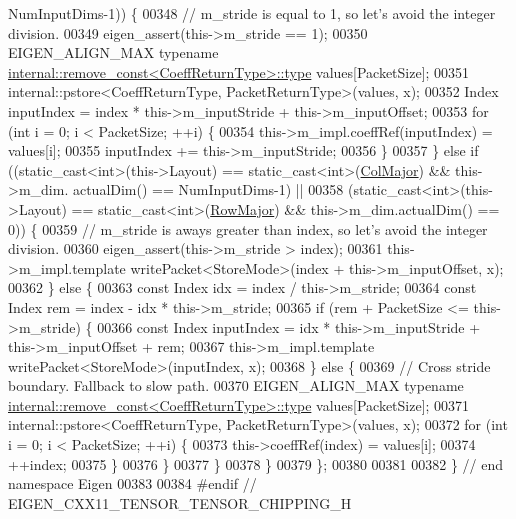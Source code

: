 \begin{DoxyCode}
      NumInputDims-1)) \{
00348       \textcolor{comment}{// m\_stride is equal to 1, so let's avoid the integer division.}
00349       eigen\_assert(this->m\_stride == 1);
00350       EIGEN\_ALIGN\_MAX \textcolor{keyword}{typename} \hyperlink{group___sparse_core___module}{internal::remove\_const<CoeffReturnType>::type}
       values[PacketSize];
00351       internal::pstore<CoeffReturnType, PacketReturnType>(values, x);
00352       Index inputIndex = index * this->m\_inputStride + this->m\_inputOffset;
00353       \textcolor{keywordflow}{for} (\textcolor{keywordtype}{int} i = 0; i < PacketSize; ++i) \{
00354         this->m\_impl.coeffRef(inputIndex) = values[i];
00355         inputIndex += this->m\_inputStride;
00356       \}
00357     \} \textcolor{keywordflow}{else} \textcolor{keywordflow}{if} ((static\_cast<int>(this->Layout) == static\_cast<int>(\hyperlink{group__enums_ggaacded1a18ae58b0f554751f6cdf9eb13a0cbd4bdd0abcfc0224c5fcb5e4f6669a}{ColMajor}) && this->m\_dim.
      actualDim() == NumInputDims-1) ||
00358            (static\_cast<int>(this->Layout) == \textcolor{keyword}{static\_cast<}\textcolor{keywordtype}{int}\textcolor{keyword}{>}(\hyperlink{group__enums_ggaacded1a18ae58b0f554751f6cdf9eb13acfcde9cd8677c5f7caf6bd603666aae3}{RowMajor}) && this->m\_dim.actualDim()
       == 0)) \{
00359       \textcolor{comment}{// m\_stride is aways greater than index, so let's avoid the integer division.}
00360       eigen\_assert(this->m\_stride > index);
00361       this->m\_impl.template writePacket<StoreMode>(index + this->m\_inputOffset, x);
00362     \} \textcolor{keywordflow}{else} \{
00363       \textcolor{keyword}{const} Index idx = index / this->m\_stride;
00364       \textcolor{keyword}{const} Index rem = index - idx * this->m\_stride;
00365       \textcolor{keywordflow}{if} (rem + PacketSize <= this->m\_stride) \{
00366         \textcolor{keyword}{const} Index inputIndex = idx * this->m\_inputStride + this->m\_inputOffset + rem;
00367         this->m\_impl.template writePacket<StoreMode>(inputIndex, x);
00368       \} \textcolor{keywordflow}{else} \{
00369         \textcolor{comment}{// Cross stride boundary. Fallback to slow path.}
00370         EIGEN\_ALIGN\_MAX \textcolor{keyword}{typename} \hyperlink{group___sparse_core___module}{internal::remove\_const<CoeffReturnType>::type}
       values[PacketSize];
00371         internal::pstore<CoeffReturnType, PacketReturnType>(values, x);
00372         \textcolor{keywordflow}{for} (\textcolor{keywordtype}{int} i = 0; i < PacketSize; ++i) \{
00373           this->coeffRef(index) = values[i];
00374           ++index;
00375         \}
00376       \}
00377     \}
00378   \}
00379 \};
00380 
00381 
00382 \} \textcolor{comment}{// end namespace Eigen}
00383 
00384 \textcolor{preprocessor}{#endif // EIGEN\_CXX11\_TENSOR\_TENSOR\_CHIPPING\_H}
\end{DoxyCode}
